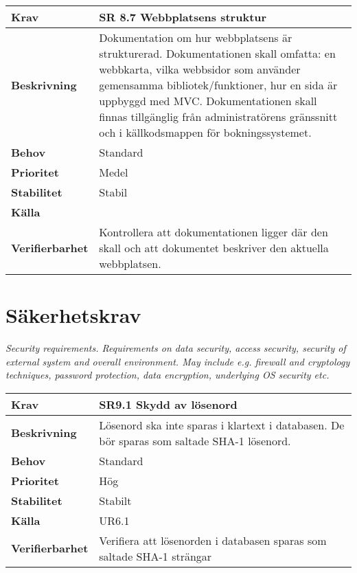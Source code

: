 \documentclass[a4paper, twoside, 11pt, titlepage]{article}
\begin{document}
	\begin{tabular} { p{2.6cm} p{12.5cm} }
		\hline
		\sffamily\textbf{Krav} & \sffamily\textbf{SR 8.7 Webbplatsens struktur } \\
		\hline
		\sffamily\textbf{Beskrivning} & Dokumentation om hur webbplatsens är strukturerad. Dokumentationen skall omfatta: en webbkarta, vilka webbsidor som använder gemensamma bibliotek/funktioner, hur en sida är uppbyggd med MVC. Dokumentationen skall finnas tillgänglig från administratörens gränssnitt och i  källkodsmappen för bokningssystemet.  \\
		\hline
		\sffamily\textbf{Behov} & Standard  \\
		\hline
		\sffamily\textbf{Prioritet} & Medel  \\
		\hline
		\sffamily\textbf{Stabilitet} & Stabil  \\
		\hline
		\sffamily\textbf{Källa} &   \\
		\hline
		\sffamily\textbf{Verifierbarhet} & Kontrollera att dokumentationen ligger där den skall och att dokumentet beskriver den aktuella webbplatsen.  \\
		\hline
	\end{tabular}


\clearpage
\section{Säkerhetskrav}


\emph{Security requirements. Requirements on data security, access security, security of external system and overall environment. May include e.g. firewall and cryptology techniques, password protection, data encryption, underlying OS security etc.}

\begin{tabular} { p{2.6cm} p{12.5cm} }
	\hline
	\sffamily\textbf{Krav} & SR9.1 Skydd av lösenord  \\
	\hline
	\sffamily\textbf{Beskrivning} & Lösenord ska inte sparas i klartext i databasen. De bör sparas som saltade SHA-1 lösenord.  \\
	\hline
	\sffamily\textbf{Behov} & Standard  \\
	\hline
	\sffamily\textbf{Prioritet} & Hög  \\
	\hline
	\sffamily\textbf{Stabilitet} & Stabilt  \\
	\hline
	\sffamily\textbf{Källa} & UR6.1  \\
	\hline
	\sffamily\textbf{Verifierbarhet} & Verifiera att lösenorden i databasen sparas som saltade SHA-1 strängar  \\
	\hline
\end{tabular}
\vspace{6mm}
\end{document}

